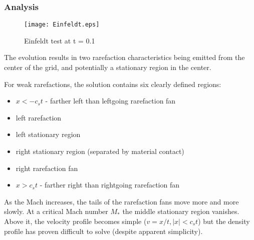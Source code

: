 \subsubsection{Analysis}

\begin{figure*}
\begin{center}
\texttt{[image: Einfeldt.eps]}
\caption{Einfeldt test at t = 0.1}
\end{center}
\end{figure*}

The evolution results in two rarefaction characteristics being emitted from the center of the
grid, and potentially a stationary region in the center.

For weak rarefactions, the solution contains six clearly defined regions:
\begin{itemize}
\item $x < -c_s t$ - farther left than leftgoing rarefaction fan
\item left rarefaction
\item left stationary region
\item right stationary region (separated by material contact)
\item right rarefaction fan
\item $x > c_s t$ - farther right than rightgoing rarefaction fan
\end{itemize}
As the Mach increases, the tails of the rarefaction fans move more and more slowly.
At a critical Mach number $M_*$ the middle stationary region vanishes. Above it,
the velocity profile becomes simple ($v = x / t, |x| < c_s t$) but the density profile
has proven difficult to solve (despite apparent simplicity).

